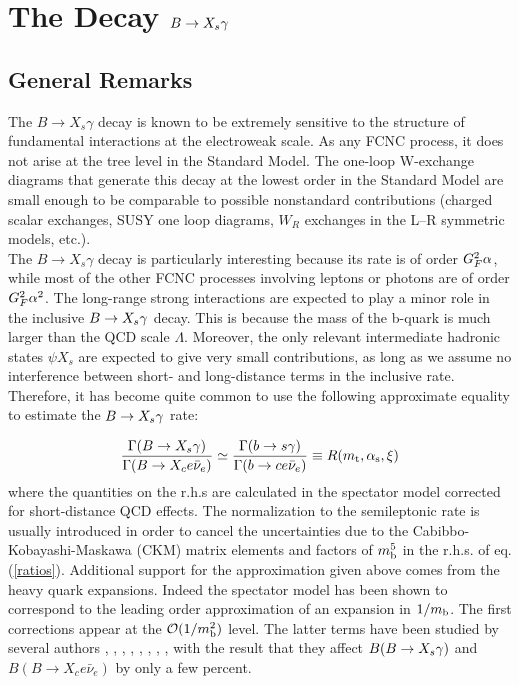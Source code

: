 \section{The Decay $B \to X_{\lowercase{s}} \gamma$}
         \label{sec:Heff:Bsgamma}
\subsection{General Remarks}
         \label{sec:Heff:Bsgamma:rem}
The $B \to X_s \gamma$ decay is known to be extremely sensitive to the
structure of fundamental interactions at the electroweak scale. As any
FCNC process, it does not arise at the tree level in the Standard
Model. The one-loop W-exchange diagrams that generate this decay at the
lowest order in the Standard Model are small enough to be comparable to
possible nonstandard contributions (charged scalar exchanges, SUSY one
loop diagrams, $W_R$ exchanges in the L--R symmetric models, etc.).\\

The $B \to X_s \gamma$ decay is particularly interesting because its
rate is of order $G_F^2 \alpha$, while most of the other FCNC processes
involving leptons or photons are of order $G_F^2 \alpha^2$.  The
long-range strong interactions are expected to play a minor role in the
inclusive $B \to X_s \gamma$ decay.  This is because the mass of the b-quark is
much larger than the QCD scale $\Lambda$. Moreover, the only relevant
intermediate hadronic states $\psi X_s$ are expected to give very small
contributions, as long as we assume no interference between short- and
long-distance terms in the inclusive rate.  Therefore, it has become
quite common to use the following approximate equality to estimate the
$B \to X_s \gamma$ rate:

\begin{equation}\label{ratios}
\frac{\Gamma(B \to X_s \gamma)}
     {\Gamma(B \to X_c e \bar{\nu}_e)}
 \simeq                                                     
\frac{\Gamma(b \to s \gamma)}
     {\Gamma(b \to c e \bar{\nu}_e)} \equiv R(m_{\rm t},\alpha_{\rm s},\xi)
\end{equation}
where the quantities on the r.h.s are calculated in the spectator model
corrected for short-distance QCD effects. The normalization to the
semileptonic rate is usually introduced in order to cancel the
uncertainties due to the Cabibbo-Kobayashi-Maskawa (CKM) matrix
elements and factors of $m_{\rm b}^5$ in the r.h.s. of eq. (\ref{ratios}).
Additional support for the approximation given above comes from the
heavy quark expansions.  Indeed the spectator model has been shown to
correspond to the leading order approximation of an expansion in
$1/m_{\rm b}$.  The first corrections appear at the ${\cal O}(1/m_{\rm b}^2)$
level. The latter terms have been studied by several authors
\cite{Chay}, \cite{Bj}, \cite{bigietal:92}, \cite{bigietal:93},
\cite{manoharwise:94}, \cite{bloketal:94}, \cite{falketal:94},
\cite{mannel:94}, \cite{Bigi} with the result that they affect
$B(B \to X_s \gamma)$ and $B(B \to X_c e \bar{\nu}_e)$ by only a few percent.


